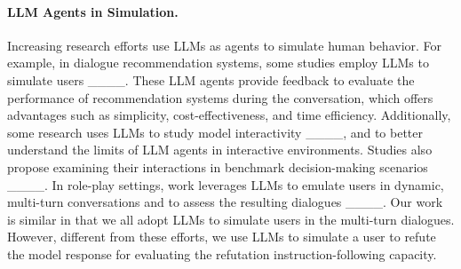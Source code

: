 
\paragraph*{LLM Agents in Simulation.}
Increasing research efforts use LLMs as agents to simulate human behavior. For example, in dialogue recommendation systems, some studies employ LLMs to simulate users ____. These LLM agents provide feedback to evaluate the performance of recommendation systems during the conversation, which offers advantages such as simplicity, cost-effectiveness, and time efficiency. Additionally, some research uses LLMs to study model interactivity ____, and to better understand the limits of LLM agents in interactive environments. Studies also propose examining their interactions in benchmark decision-making scenarios ____. In role-play settings, work leverages LLMs to emulate users in dynamic, multi-turn conversations and to assess the resulting dialogues ____. Our work is similar in that we all adopt LLMs to simulate users in the multi-turn dialogues. However, different from these efforts, we use LLMs to simulate a user to refute the model response for evaluating the refutation instruction-following capacity.
